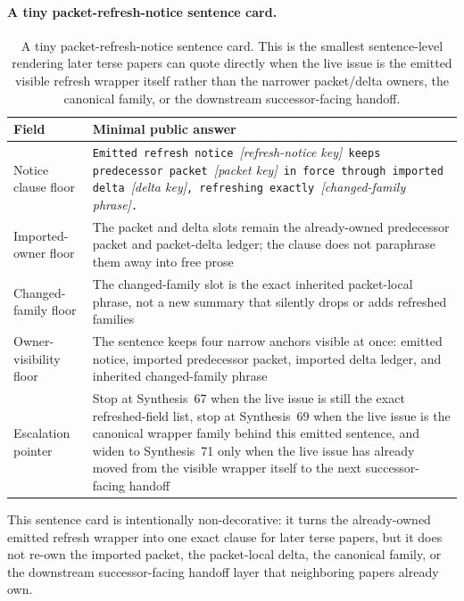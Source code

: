 \documentclass[11pt]{article}
\begin{document}
\paragraph{A tiny packet-refresh-notice sentence card.}
\begin{table}[t]
\centering
\small
\begin{tabularx}{\linewidth}{@{}lX@{}}
\toprule
Field & Minimal public answer \\
\midrule
Notice clause floor & \texttt{Emitted refresh notice }\emph{[refresh-notice key]}\texttt{ keeps predecessor packet }\emph{[packet key]}\texttt{ in force through imported delta }\emph{[delta key]}\texttt{, refreshing exactly }\emph{[changed-family phrase]}\texttt{.} \\
Imported-owner floor & The packet and delta slots remain the already-owned predecessor packet and packet-delta ledger; the clause does not paraphrase them away into free prose \\
Changed-family floor & The changed-family slot is the exact inherited packet-local phrase, not a new summary that silently drops or adds refreshed families \\
Owner-visibility floor & The sentence keeps four narrow anchors visible at once: emitted notice, imported predecessor packet, imported delta ledger, and inherited changed-family phrase \\
Escalation pointer & Stop at Synthesis~67 when the live issue is still the exact refreshed-field list, stop at Synthesis~69 when the live issue is the canonical wrapper family behind this emitted sentence, and widen to Synthesis~71 only when the live issue has already moved from the visible wrapper itself to the next successor-facing handoff \\
\bottomrule
\end{tabularx}
\caption{A tiny packet-refresh-notice sentence card. This is the smallest sentence-level rendering later terse papers can quote directly when the live issue is the emitted visible refresh wrapper itself rather than the narrower packet/delta owners, the canonical family, or the downstream successor-facing handoff.}
\label{tab:tiny-packet-refresh-notice-sentence-card}
\end{table}

This sentence card is intentionally non-decorative: it turns the already-owned emitted refresh wrapper into one exact clause for later terse papers, but it does not re-own the imported packet, the packet-local delta, the canonical family, or the downstream successor-facing handoff layer that neighboring papers already own.\cite{series:workedexample}
\end{document}
